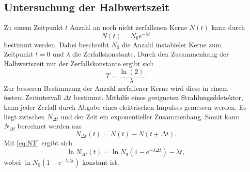 \subsection{Untersuchung der Halbwertszeit}
Zu einem Zeitpunkt $t$ Anzahl an noch nicht zerfallenen Kerne $N(t)$ kann durch
\begin{equation}
    \label{eq:Nt}
    N(t) = N_0 e^{-\lambda t}
\end{equation}
bestimmt werden.
Dabei beschreibt $N_0$ die Anzahl instabieler Kerne zum Zeitpunkt $t = 0$ und $\lambda$ die Zerfallskonstante.
Durch den Zusammenhang der Halbwertszeit mit der Zerfallskonstante ergibt sich 
\begin{equation}
    \label{eq:T}
    T = \frac{\ln(2)}{\lambda}.
\end{equation}
Zur besseren Bestimmung der Anzahl zerfallener Kerne wird diese in einem festem Zeitintervall $\Delta t$ bestimmt.
Mithilfe eines geeigneten Strahlungsddetektor, kann jeder Zerfall durch Abgabe eines elektrischen Impulses gemessen werden.
Es liegt zwischen $N_{\Delta t}$ und der Zeit ein exponentieller Zusammenhang.
Somit kann $N_{\Delta t}$ berechnet werden aus
\begin{equation}
    N_{\Delta t}(t) = N(t) - N(t + \Delta t).
\end{equation}
Mit \ref{eq:NT} ergibt sich
\begin{equation}
    \ln N_{\Delta t}(t) = \ln N_0(1 - e^{-\lambda \Delta t}) -\lambda t,
\end{equation}
wobei $\ln N_0(1 - e^{-\lambda \Delta t})$ konstant ist.


\cite{sample}
